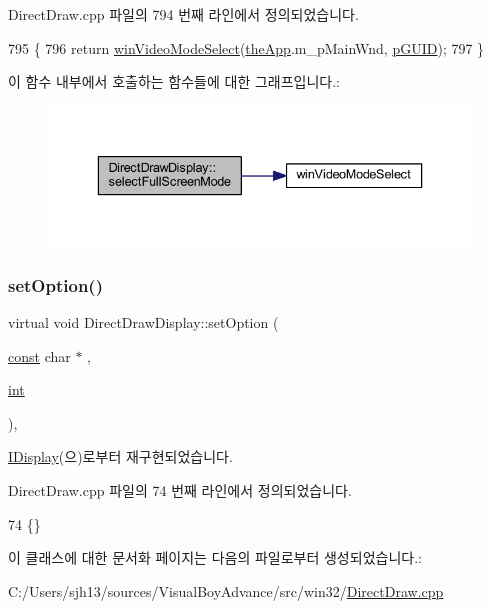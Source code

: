 Direct\+Draw.\+cpp 파일의 794 번째 라인에서 정의되었습니다.


\begin{DoxyCode}
795 \{
796   \textcolor{keywordflow}{return} \mbox{\hyperlink{_direct_draw_8cpp_a84893b1d1b564ef7c28a566cba2c1023}{winVideoModeSelect}}(\mbox{\hyperlink{_v_b_a_8cpp_a8095a9d06b37a7efe3723f3218ad8fb3}{theApp}}.m\_pMainWnd, \mbox{\hyperlink{_video_mode_8cpp_a53702c538e287c41ffc68a11699623ce}{pGUID}});
797 \}
\end{DoxyCode}
이 함수 내부에서 호출하는 함수들에 대한 그래프입니다.\+:
\nopagebreak
\begin{figure}[H]
\begin{center}
\leavevmode
\includegraphics[width=336pt]{class_direct_draw_display_a10d4f6b14b3f4de2edb60e05a4277d25_cgraph}
\end{center}
\end{figure}
\mbox{\label{class_direct_draw_display_a94010855bad5354842c7c7062ab4ce03}} 
\subsubsection{\texorpdfstring{set\+Option()}{setOption()}}
{\footnotesize\ttfamily virtual void Direct\+Draw\+Display\+::set\+Option (\begin{DoxyParamCaption}\item[{\mbox{\hyperlink{getopt1_8c_a2c212835823e3c54a8ab6d95c652660e}{const}} char $\ast$}]{,  }\item[{\mbox{\hyperlink{_util_8cpp_a0ef32aa8672df19503a49fab2d0c8071}{int}}}]{ }\end{DoxyParamCaption})\hspace{0.3cm}{\ttfamily [inline]}, {\ttfamily [virtual]}}



\mbox{\hyperlink{class_i_display_a1766244708c252bb8781892c76c20ba9}{I\+Display}}(으)로부터 재구현되었습니다.



Direct\+Draw.\+cpp 파일의 74 번째 라인에서 정의되었습니다.


\begin{DoxyCode}
74 \{\}
\end{DoxyCode}


이 클래스에 대한 문서화 페이지는 다음의 파일로부터 생성되었습니다.\+:\begin{DoxyCompactItemize}
\item 
C\+:/\+Users/sjh13/sources/\+Visual\+Boy\+Advance/src/win32/\mbox{\hyperlink{_direct_draw_8cpp}{Direct\+Draw.\+cpp}}\end{DoxyCompactItemize}
